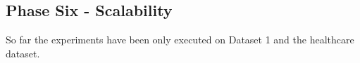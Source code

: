 \newpage
\subsection{Phase Six - Scalability}
\label{sec:phase6}
So far the experiments have been only executed on Dataset 1 and the healthcare dataset.